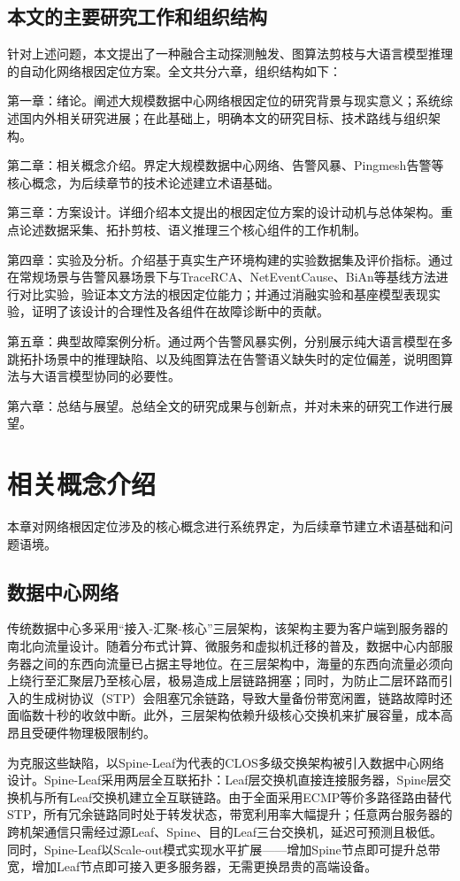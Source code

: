 \section{本文的主要研究工作和组织结构}
针对上述问题，本文提出了一种融合主动探测触发、图算法剪枝与大语言模型推理的自动化网络根因定位方案。全文共分六章，组织结构如下：

第一章：绪论。阐述大规模数据中心网络根因定位的研究背景与现实意义；系统综述国内外相关研究进展；在此基础上，明确本文的研究目标、技术路线与组织架构。

第二章：相关概念介绍。界定大规模数据中心网络、告警风暴、Pingmesh告警等核心概念，为后续章节的技术论述建立术语基础。

第三章：方案设计。详细介绍本文提出的根因定位方案的设计动机与总体架构。重点论述数据采集、拓扑剪枝、语义推理三个核心组件的工作机制。

第四章：实验及分析。介绍基于真实生产环境构建的实验数据集及评价指标。通过在常规场景与告警风暴场景下与TraceRCA、NetEventCause、BiAn等基线方法进行对比实验，验证本文方法的根因定位能力；并通过消融实验和基座模型表现实验，证明了该设计的合理性及各组件在故障诊断中的贡献。

第五章：典型故障案例分析。通过两个告警风暴实例，分别展示纯大语言模型在多跳拓扑场景中的推理缺陷、以及纯图算法在告警语义缺失时的定位偏差，说明图算法与大语言模型协同的必要性。

第六章：总结与展望。总结全文的研究成果与创新点，并对未来的研究工作进行展望。

\chapter{相关概念介绍}

本章对网络根因定位涉及的核心概念进行系统界定，为后续章节建立术语基础和问题语境。

\section{数据中心网络}

传统数据中心多采用“接入-汇聚-核心”三层架构，该架构主要为客户端到服务器的南北向流量设计。随着分布式计算、微服务和虚拟机迁移的普及，数据中心内部服务器之间的东西向流量已占据主导地位。在三层架构中，海量的东西向流量必须向上绕行至汇聚层乃至核心层，极易造成上层链路拥塞；同时，为防止二层环路而引入的生成树协议（STP）会阻塞冗余链路，导致大量备份带宽闲置，链路故障时还面临数十秒的收敛中断。此外，三层架构依赖升级核心交换机来扩展容量，成本高昂且受硬件物理极限制约。

为克服这些缺陷，以Spine-Leaf为代表的CLOS多级交换架构被引入数据中心网络设计。Spine-Leaf采用两层全互联拓扑：Leaf层交换机直接连接服务器，Spine层交换机与所有Leaf交换机建立全互联链路。由于全面采用ECMP等价多路径路由替代STP，所有冗余链路同时处于转发状态，带宽利用率大幅提升；任意两台服务器的跨机架通信只需经过源Leaf、Spine、目的Leaf三台交换机，延迟可预测且极低。同时，Spine-Leaf以Scale-out模式实现水平扩展——增加Spine节点即可提升总带宽，增加Leaf节点即可接入更多服务器，无需更换昂贵的高端设备。

